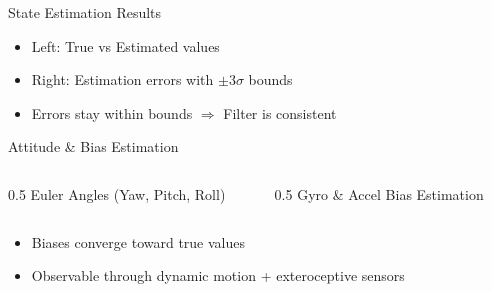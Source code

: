\documentclass{beamer}
\begin{document}
\begin{frame}{State Estimation Results}
\begin{center}
\end{center}

\begin{itemize}
    \item Left: True vs Estimated values
    \item Right: Estimation errors with $\pm 3\sigma$ bounds
    \item Errors stay within bounds $\Rightarrow$ Filter is consistent
\end{itemize}
\end{frame}

\begin{frame}{Attitude \& Bias Estimation}
\begin{columns}
\begin{column}{0.5\textwidth}
\centering
\small Euler Angles (Yaw, Pitch, Roll)
\end{column}

\begin{column}{0.5\textwidth}
\centering
\small Gyro \& Accel Bias Estimation
\end{column}
\end{columns}

\vspace{0.5cm}
\begin{itemize}
    \item Biases converge toward true values
    \item Observable through dynamic motion + exteroceptive sensors
\end{itemize}
\end{frame}
\end{document}
